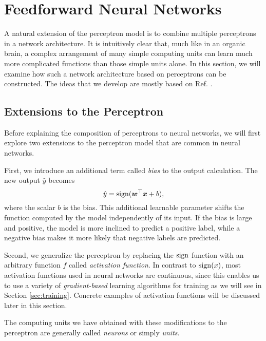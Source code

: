 \section{Feedforward Neural Networks}
\label{sec:feedforward_neural_networks}
A natural extension of the perceptron model is to combine multiple perceptrons in a network architecture. It is intuitively clear that, much like in an organic brain, a complex arrangement of many simple computing units can learn much more complicated functions than those simple units alone. In this section, we will examine how such a network architecture based on perceptrons can be constructed. The ideas that we develop are mostly based on Ref. \cite[Ch. 6]{DBLP:books/daglib/0040158}.

\subsection{Extensions to the Perceptron}
Before explaining the composition of perceptrons to neural networks, we will first explore two extensions to the perceptron model that are common in neural networks.

First, we introduce an additional term called \emph{bias} to the output calculation. The new output $\hat{y}$ becomes
\begin{equation}
\hat{y} = \operatorname{sign}(\bm{w}^\top\bm{x} + b),
\end{equation}
where the scalar $b$ is the bias. This additional learnable parameter shifts the function computed by the model independently of its input. If the bias is large and positive, the model is more inclined to predict a positive label, while a negative bias makes it more likely that negative labels are predicted.

Second, we generalize the perceptron by replacing the $\operatorname{sign}$ function with an arbitrary function $f$ called \emph{activation function}. In contrast to $\operatorname{sign}(x)$, most activation functions used in neural networks are continuous, since this enables us to use a variety of \emph{gradient-based} learning algorithms for training as we will see in Section \ref{sec:training}. Concrete examples of activation functions will be discussed later in this section.

The computing units we have obtained with these modifications to the perceptron are generally called \emph{neurons} or simply \emph{units}.

